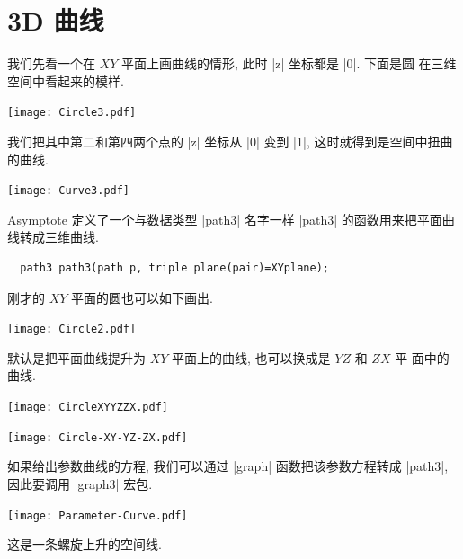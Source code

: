 \documentclass[nofonts,CJKnormalspaces]{ctexbook}[2009/05/20]
\begin{document}
\section{3D 曲线}
我们先看一个在 $XY$ 平面上画曲线的情形, 此时 |z| 坐标都是 |0|. 下面是圆
在三维空间中看起来的模样.
\begin{center}\texttt{[image: Circle3.pdf]}\end{center}%

我们把其中第二和第四两个点的 |z| 坐标从 |0| 变到 |1|, 这时就得到是空间中扭曲
的曲线.
\begin{center}\texttt{[image: Curve3.pdf]}\end{center}%


Asymptote 定义了一个与数据类型 |path3| 名字一样 |path3| 的函数用来把平面曲
线转成三维曲线.
\begin{lstlisting}
  path3 path3(path p, triple plane(pair)=XYplane);
\end{lstlisting}

刚才的 $XY$ 平面的圆也可以如下画出.
\begin{center}\texttt{[image: Circle2.pdf]}\end{center}%

默认是把平面曲线提升为 $XY$ 平面上的曲线, 也可以换成是 $YZ$ 和 $ZX$ 平
面中的曲线.
\begin{center}\texttt{[image: CircleXYYZZX.pdf]}\end{center}%


\begin{center}\texttt{[image: Circle-XY-YZ-ZX.pdf]}\end{center}%


如果给出参数曲线的方程, 我们可以通过 |graph| 函数把该参数方程转成
|path3|, 因此要调用 |graph3| 宏包.
\begin{center}\texttt{[image: Parameter-Curve.pdf]}\end{center}%

这是一条螺旋上升的空间线.
\end{document}
